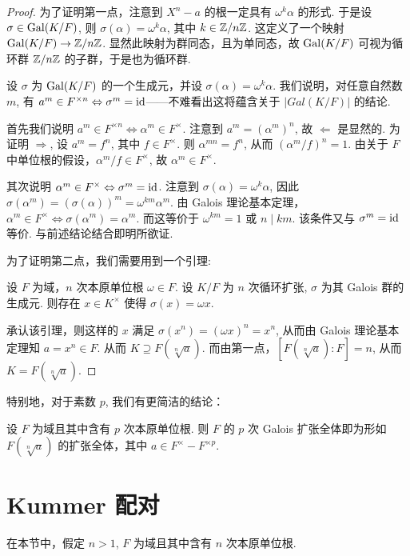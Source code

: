 \begin{proof}
  为了证明第一点，注意到 $X^n - a$ 的根一定具有 $\omega^k \alpha$ 的形式.  于是设 $\sigma \in \operatorname{Gal}(K/F)$, 则 $\sigma(\alpha) = \omega^k \alpha$, 其中 $k \in \mathbb Z/n\mathbb Z$.  这定义了一个映射 $\operatorname{Gal}(K/F) \to \mathbb Z/n\mathbb Z$.  显然此映射为群同态，且为单同态，故 $\operatorname{Gal}(K/F)$ 可视为循环群 $\mathbb Z/n\mathbb Z$ 的子群，于是也为循环群.

  设 $\sigma$ 为 $\operatorname{Gal}(K/F)$ 的一个生成元，并设 $\sigma(\alpha) = \omega^k \alpha$.  我们说明，对任意自然数 $m$, 有 $a^m \in F^{\times n} \Leftrightarrow \sigma^m = \operatorname{id}$——不难看出这将蕴含关于 $|Gal(K/F)|$ 的结论.

  首先我们说明 $a^m \in F^{\times n} \Leftrightarrow \alpha^m \in F^\times$.  注意到 $a^m = (\alpha^m)^n$, 故 $\Leftarrow$ 是显然的.  为证明 $\Rightarrow$, 设 $a^m = f^n$, 其中 $f \in F^\times$.  则 $\alpha^{mn} = f^n$, 从而 $(\alpha^m/f)^n = 1$.  由关于 $F$ 中单位根的假设，$\alpha^m/f \in F^\times$, 故 $\alpha^m \in F^\times$.

  其次说明 $\alpha^m \in F^\times \Leftrightarrow \sigma^m = \operatorname{id}$.  注意到 $\sigma(\alpha) = \omega^k \alpha$, 因此 $\sigma(\alpha^m) = (\sigma(\alpha))^m = \omega^{km} \alpha^m$.  由 Galois 理论基本定理，$\alpha^m \in F^\times \Leftrightarrow \sigma(\alpha^m) = \alpha^m$.  而这等价于 $\omega^{km} = 1$ 或 $n \mid km$.  该条件又与 $\sigma^m = \operatorname{id}$ 等价.  与前述结论结合即明所欲证.

  为了证明第二点，我们需要用到一个引理:
  \begin{lemma}[Hilbert “定理 90”]
    设 $F$ 为域，$n$ 次本原单位根 $\omega \in F$.  设 $K/F$ 为 $n$ 次循环扩张, $\sigma$ 为其 Galois 群的生成元.  则存在 $x \in K^\times$ 使得 $\sigma(x) = \omega x$.
  \end{lemma}

  承认该引理，则这样的 $x$ 满足 $\sigma(x^n) = (\omega x)^n = x^n$, 从而由 Galois 理论基本定理知 $a = x^n \in F$.  从而 $K \supseteq F(\sqrt[n]{a})$.  而由第一点，$[F(\sqrt[n]{a}) : F] = n$, 从而 $K = F(\sqrt[n]{a})$.
\end{proof}

特别地，对于素数 $p$, 我们有更简洁的结论：
\begin{cor}
  设 $F$ 为域且其中含有 $p$ 次本原单位根.  则 $F$ 的 $p$ 次 Galois 扩张全体即为形如 $F(\sqrt[n]{a})$ 的扩张全体，其中 $a \in F^\times - F^{\times p}$.
\end{cor}

\section{Kummer 配对}
在本节中，假定 $n > 1$, $F$ 为域且其中含有 $n$ 次本原单位根.

